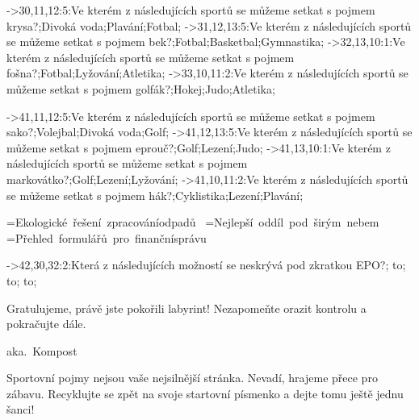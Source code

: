 ->30,11,12:5:Ve kterém z následujících sportů se může\-me setkat s pojmem {\questionfontit krysa}?;Divoká voda;Plavání;Fotbal;%
->31,12,13:5:Ve kterém z následujících sportů se může\-me setkat s pojmem {\questionfontit bek}?;Fotbal;Basketbal;Gymnastika;%
->32,13,10:1:Ve kterém z následujících sportů se může\-me setkat s pojmem {\questionfontit fošna}?;Fotbal;Lyžování;Atletika;%
->33,10,11:2:Ve kterém z následujících sportů se může\-me setkat s pojmem {\questionfontit golfák}?;Hokej;Judo;Atletika;%

->41,11,12:5:Ve kterém z následujících sportů se může\-me setkat s pojmem {\questionfontit sako}?;Volejbal;Divoká voda;Golf;%
->41,12,13:5:Ve kterém z následujících sportů se může\-me setkat s pojmem {\questionfontit eprouč}?;Golf;Lezení;Judo;%
->41,13,10:1:Ve kterém z následujících sportů se může\-me setkat s pojmem {\questionfontit markovátko}?;Golf;Lezení;Lyžování;%
->41,10,11:2:Ve kterém z následujících sportů se může\-me setkat s pojmem {\questionfontit hák}?;Cyklistika;Lezení;Plavání;%

=\vbox{\questionfont\baselineskip=40pt\hbox{Ekologické řešení zpracování}\hbox{odpadů}\hbox{~}}
=\vbox{\questionfont\baselineskip=40pt\hbox{Nejlepší oddíl pod širým nebem}\hbox{~}}
=\vbox{\questionfont\baselineskip=40pt\hbox{Přehled formulářů pro finanční}\hbox{správu}\hbox{~}}

->42,30,32:2:Která z následujících možností se {\questionfontit neskrý\-vá} pod zkratkou {\questionfontit EPO}?;{ \vbox to};{ \vbox to};{ \vbox to};%


%


%
%
\centerline{\topletterfont{}}
\vskip2cm
\baselineskip=50pt
{\finishfont Gratulujeme, právě jste po\-ko\-ři\-li labyrint! Nezapomeňte o\-ra\-zit kontrolu a pokračujte dále.}
\footing


%
%
\centerline{\topletterfont{}}
\vskip2cm
\centerline{\kompostfont aka.\ Kompost}
\vskip2cm
\baselineskip=40pt
{\questionfont Sportovní pojmy nejsou vaše nej\-sil\-nější stránka. Nevadí, hra\-je\-me přece pro zá\-ba\-vu. Re\-cyk\-luj\-te se zpět na svoje startovní písmenko a dejte tomu ještě jed\-nu šanci!}
\footing


%
%
\bye
